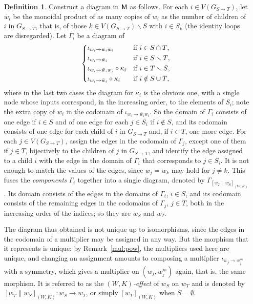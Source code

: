 \documentclass[12pt]{amsart}
\theoremstyle{plain}
\theoremstyle{definition}
\newtheorem{defn}[thm]{Definition}
\theoremstyle{remark}
\numberwithin{equation}{section}
\theoremstyle{plain}
\newcommand{\0}{\emptyset}
\newcommand{\fun}{\longrightarrow}
\newcommand{\mi}{\smallsetminus}
\newcommand{\cat}[1]{\textup{\textsf{#1}}}
\newcommand{\memph}[1]{{\color{magenta}\emph{#1}}}
\newcommand{\stri}{\Gamma}
\begin{document}
\begin{defn}
Construct a diagram in $\cat M$  as follows. For each $i \in V(G_{S \rightarrow T})$, let $\bar w_i$ be the monoidal product of as many copies of $w_i$ as the number of children of $i$ in $G_{S \rightarrow T}$, that is, of those $k \in V(G_{S \rightarrow T}) \mi S$ with $i \in S_k$ (the identity loops are disregarded). Let $\stri_i$ be a  diagram of
\[
\begin{dcases*}
   \iota_{w_i \rightarrow \bar w_i w_i}                & if $i \in S \cap T$,\\
   \iota_{w_i \rightarrow \bar w_i}                            & if $i \in S \mi T$,\\
  \iota_{w_i \rightarrow \bar w_i w_i} \circ \kappa_i  & if $i \in T \mi S$,\\
  \iota_{w_i \rightarrow \bar w_i} \circ \kappa_i              & if $i \notin S \cup T$,
\end{dcases*}
\]
where in the last two cases the diagram for $\kappa_i$ is the obvious one, with a single node whose inputs correspond, in the increasing order, to the elements of $S_i$; note the extra copy of $w_i$ in the codomain of $\iota_{w_i \rightarrow \bar w_i w_i}$. So the domain of $\stri_i$ consists of one edge if $i \in S$ and of one edge for each $j \in S_i$ if $i \notin S$, and its codomain consists of one edge for each child of $i$ in $G_{S \rightarrow T}$ and, if $i \in T$, one more edge. For each $j \in V(G_{S \rightarrow T})$, assign the edges in the codomain of $\stri_j$, except one of them if $j \in T$, bijectively to the children of $j$ in $G_{S \rightarrow T}$, and identify the edge assigned to a child $i$ with the edge in the domain of $\stri_i$ that corresponds to $j \in S_i$. It is not enough to match the values of the edges, since $w_j = w_k$ may hold for $j \neq k$. This fuses the \memph{components} $\stri_i$ together into a single  diagram, denoted by $\stri_{[w_T \| w_S]_{(W, K)}}$. Its domain consists of the edges in the domains of $\stri_i$, $i \in S$, and its codomain consists of the remaining edges in the codomains of $\stri_j$, $j \in T$, both in the increasing order of the indices; so they are $w_S$ and $w_T$.

The diagram thus obtained is not unique up to isomorphisms, since the edges in the codomain of a multiplier may be assigned in any way. But the morphism that it represents is unique: by Remark~\ref{mul:pow}, the multipliers used here are unique, and changing an assignment amounts to composing a multiplier $\iota_{w_j \rightarrow w_j^m}$ with a symmetry, which gives a multiplier on $(w_j, w_j^m)$ again, that is, the same morphism. It is referred to as the \memph{$(W, K)$-effect} of $w_S$ on $w_T$ and is denoted by $[w_T \| w_S]_{(W, K)} : w_S \fun w_T$, or simply $[w_T]_{(W, K)}$ when $S = \0$.


\end{defn}
\end{document}
